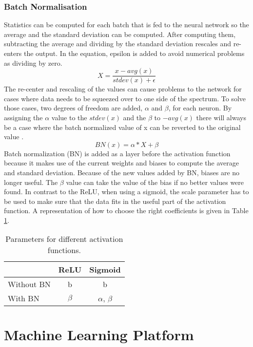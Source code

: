 \subsection{Batch Normalisation}
Statistics can be computed for each batch that is fed to the neural network so the average and the standard deviation can be computed. After computing them, subtracting the average and dividing by the standard deviation rescales and re-enters the output. 
In the equation, epsilon is added to avoid numerical problems as dividing by zero.
\begin{equation}
    X= \dfrac{x - avg(x)}{stdev(x) + \epsilon} 
\end{equation}
The re-center and rescaling of the values can cause problems to
the network for cases where data needs to be squeezed over 
to one side of the spectrum.
To solve those cases, two degrees of freedom are added, 
$\alpha$ and $\beta$, for each neuron. 
By assigning the $\alpha$ value to the $stdev(x)$ and the
$\beta$ to $-avg(x)$ there will always be a case where the batch
normalized value of x can be reverted to the original value \cite{MonDieu}.
\begin{equation}
    BN(x) = \alpha * X + \beta
\end{equation}
Batch normalization (BN) is added as a layer before the activation function
because it makes use of the current weights and biases to
compute the average and standard deviation. Because of the new values added by BN,
biases are no longer useful.
The $\beta$ value can take the value of the bias if no better
values were found.
In contrast to the ReLU, when using a sigmoid,
the scale parameter has to be used to make sure that
the data fits in the useful part of the activation function.
A representation of how to choose the right coefficients is
given in Table \ref{tab:Parameters}.
\begin{table}[H]
\centering
    \caption{Parameters for different activation functions.}
    \begin{tabular}{l c c}
    \toprule
          & ReLU & Sigmoid \\\midrule
        Without BN &b & b  \\
        With BN & $\beta$ & $\alpha$, $\beta$  \\
    \bottomrule
    \end{tabular}
\label{tab:Parameters}
\end{table}

\chapter{Machine Learning Platform}\label{ch:machine_learning_platform}
